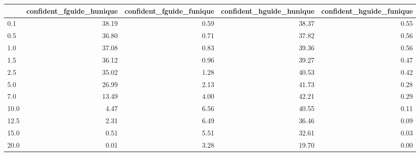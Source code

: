 \begin{tabular}{lrrrr}
\toprule
 & confident_fguide_hunique & confident_fguide_funique & confident_hguide_hunique & confident_hguide_funique \\
\midrule
0.1 & 38.19 & 0.59 & 38.37 & 0.55 \\
0.5 & 36.80 & 0.71 & 37.82 & 0.56 \\
1.0 & 37.08 & 0.83 & 39.36 & 0.56 \\
1.5 & 36.12 & 0.96 & 39.27 & 0.47 \\
2.5 & 35.02 & 1.28 & 40.53 & 0.42 \\
5.0 & 26.99 & 2.13 & 41.73 & 0.28 \\
7.0 & 13.49 & 4.00 & 42.21 & 0.29 \\
10.0 & 4.47 & 6.56 & 40.55 & 0.11 \\
12.5 & 2.31 & 6.49 & 36.46 & 0.09 \\
15.0 & 0.51 & 5.51 & 32.61 & 0.03 \\
20.0 & 0.01 & 3.28 & 19.70 & 0.00 \\
\bottomrule
\end{tabular}
